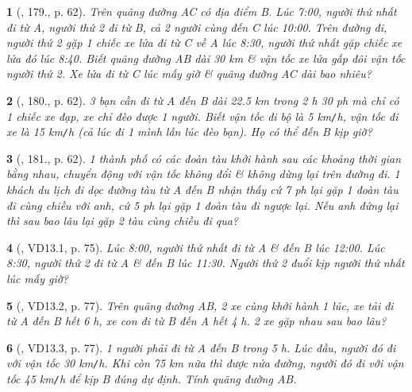 \documentclass{article}
\newtheorem{baitoan}{}
\begin{document}
\begin{baitoan}[\cite{Binh_Toan_6_tap_2}, 179., p. 62]
	Trên quãng đường AC có địa điểm B. Lúc {\rm7:00}, người thứ nhất đi từ A, người thứ 2 đi từ B, cả 2 người cùng đến C lúc {\rm10:00}. Trên đường đi, người thứ 2 gặp 1 chiếc xe lửa đi từ C về A lúc {\rm8:30}, người thứ nhất gặp chiếc xe lửa đó lúc {\rm8:40}. Biết quãng đường AB dài {\rm30 km} \& vận tốc xe lửa gấp đôi vận tốc người thứ 2. Xe lửa đi từ C lúc mấy giờ \& quãng đường AC dài bao nhiêu?
\end{baitoan}

\begin{baitoan}[\cite{Binh_Toan_6_tap_2}, 180., p. 62]
	3 bạn cần đi từ A đến B dài {\rm22.5 km} trong {\rm2 h 30 ph} mà chỉ có 1 chiếc xe đạp, xe chỉ đèo được 1 người. Biết vận tốc đi bộ là {\rm5 km{\tt/}h}, vận tốc đi xe là {\rm15 km{\tt/}h} (cả lúc đi 1 mình lẫn lúc đèo bạn). Họ có thể đến B kịp giờ?
\end{baitoan}

\begin{baitoan}[\cite{Binh_Toan_6_tap_2}, 181., p. 62]
	1 thành phố có các đoàn tàu khởi hành sau các khoảng thời gian bằng nhau, chuyển động với vận tốc không đổi \& không dừng lại trên đường đi. 1 khách du lịch đi dọc đường tàu từ A đến B nhận thấy cứ {\rm7 ph} lại gặp 1 đoàn tàu đi cùng chiều với anh, cứ {\rm5 ph} lại gặp 1 đoàn tàu đi ngược lại. Nếu anh đứng lại thì sau bao lâu lại gặp 2 tàu cùng chiều đi qua?
\end{baitoan}

\begin{baitoan}[\cite{TLCT_THCS_Toan_6_so_hoc}, VD13.1, p. 75]
	Lúc {\rm8:00}, người thứ nhất đi từ A \& đến B lúc {\rm12:00}. Lúc {\rm8:30}, người thứ 2 đi từ A \& đến B lúc {\rm11:30}. Người thứ 2 đuổi kịp người thứ nhất lúc mấy giờ?
\end{baitoan}

\begin{baitoan}[\cite{TLCT_THCS_Toan_6_so_hoc}, VD13.2, p. 77]
	Trên quãng đường AB, 2 xe cùng khởi hành 1 lúc, xe tải đi từ A đến B hết {\rm6 h}, xe con đi từ B đến A hết {\rm4 h}. 2 xe gặp nhau sau bao lâu?
\end{baitoan}

\begin{baitoan}[\cite{TLCT_THCS_Toan_6_so_hoc}, VD13.3, p. 77]
	1 người phải đi từ A đến B trong {\rm5 h}. Lúc đầu, người đó đi với vận tốc {\rm30 km{\tt/}h}. Khi còn {\rm75 km} nữa thì được nửa đường, người đó đi với vận tốc {\rm45 km{\tt/}h} để kịp B đúng dự định. Tính quãng đường AB.
\end{baitoan}
\end{document}

